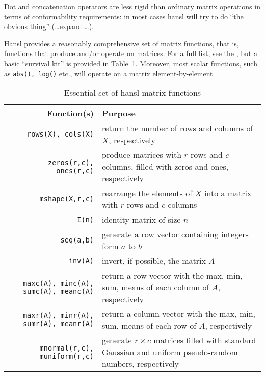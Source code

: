 Dot and concatenation operators are less rigid than ordinary matrix
operations in terms of conformability requirements: in most cases
hansl will try to do ``the obvious thing'' (\ldots expand \ldots).

Hansl provides a reasonably comprehensive set of matrix functions,
that is, functions that produce and/or operate on matrices. For a
full list, see the \GCR, but a basic ``survival kit'' is provided
in Table~\ref{tab:essential-matfuncs}.  Moreover, most scalar
functions, such as \texttt{abs(), log()} etc., will operate on a
matrix element-by-element.

\begin{table}[htbp]
  \centering
  \begin{tabular}{rp{}}
    \textbf{Function(s)} & \textbf{Purpose} \\
    \hline
    \texttt{rows(X), cols(X)} & return the number of rows and columns
    of $X$, respectively \\
    \texttt{zeros(r,c), ones(r,c)} & produce matrices with $r$ rows
    and $c$ columns, filled with zeros and ones, respectively \\
    \texttt{mshape(X,r,c)} & rearrange the elements of $X$ into a
    matrix with $r$ rows and $c$ columns \\
    \texttt{I(n)} & identity matrix of size $n$ \\
    \texttt{seq(a,b)} & generate a row vector containing integers form
    $a$ to $b$ \\
    \texttt{inv(A)} & invert, if possible, the matrix $A$ \\
    \texttt{maxc(A), minc(A), sumc(A), meanc(A)} & return a row vector
    with the max, min, sum, means of each column of $A$, respectively\\
    \texttt{maxr(A), minr(A), sumr(A), meanr(A)} & return a column vector
    with the max, min, sum, means of each row of $A$, respectively\\
    \texttt{mnormal(r,c), muniform(r,c)} & generate $r \times c$
    matrices filled with standard Gaussian and uniform pseudo-random
    numbers, respectively \\
    \hline
  \end{tabular}
  \caption{Essential set of hansl matrix functions}
  \label{tab:essential-matfuncs}
\end{table}


